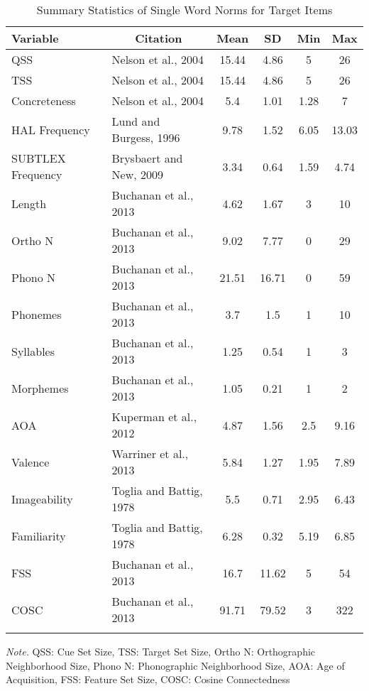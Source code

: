\documentclass[english,man]{apa6}
\theoremstyle{definition}
\theoremstyle{definition}
\theoremstyle{remark}
\begin{document}
\begin{table}[tbp]
\begin{center}
\begin{threeparttable}
\caption{\label{tab:unnamed-chunk-3}Summary Statistics of Single Word Norms for Target Items}
\begin{tabular}{llcccc}
\toprule
Variable & \multicolumn{1}{c}{Citation} & \multicolumn{1}{c}{Mean} & \multicolumn{1}{c}{SD} & \multicolumn{1}{c}{Min} & \multicolumn{1}{c}{Max}\\
\midrule
QSS & Nelson et al., 2004 & 15.44 & 4.86 & 5 & 26\\
TSS & Nelson et al., 2004 & 15.44 & 4.86 & 5 & 26\\
Concreteness & Nelson et al., 2004 & 5.4 & 1.01 & 1.28 & 7\\
HAL Frequency & Lund and Burgess, 1996 & 9.78 & 1.52 & 6.05 & 13.03\\
SUBTLEX Frequency & Brysbaert and New, 2009 & 3.34 & 0.64 & 1.59 & 4.74\\
Length & Buchanan et al., 2013 & 4.62 & 1.67 & 3 & 10\\
Ortho N & Buchanan et al., 2013 & 9.02 & 7.77 & 0 & 29\\
Phono N & Buchanan et al., 2013 & 21.51 & 16.71 & 0 & 59\\
Phonemes & Buchanan et al., 2013 & 3.7 & 1.5 & 1 & 10\\
Syllables & Buchanan et al., 2013 & 1.25 & 0.54 & 1 & 3\\
Morphemes & Buchanan et al., 2013 & 1.05 & 0.21 & 1 & 2\\
AOA & Kuperman et al., 2012 & 4.87 & 1.56 & 2.5 & 9.16\\
Valence & Warriner et al., 2013 & 5.84 & 1.27 & 1.95 & 7.89\\
Imageability & Toglia and Battig, 1978 & 5.5 & 0.71 & 2.95 & 6.43\\
Familiarity & Toglia and Battig, 1978 & 6.28 & 0.32 & 5.19 & 6.85\\
FSS & Buchanan et al., 2013 & 16.7 & 11.62 & 5 & 54\\
COSC & Buchanan et al., 2013 & 91.71 & 79.52 & 3 & 322\\
\bottomrule
\addlinespace
\end{tabular}
\begin{tablenotes}[para]
\textit{Note.} QSS: Cue Set Size, TSS: Target Set Size, Ortho N: Orthographic Neighborhood Size, Phono N: Phonographic Neighborhood Size, AOA: Age of Acquisition, FSS: Feature Set Size, COSC: Cosine Connectedness
\end{tablenotes}
\end{threeparttable}
\end{center}
\end{table}
\end{document}

